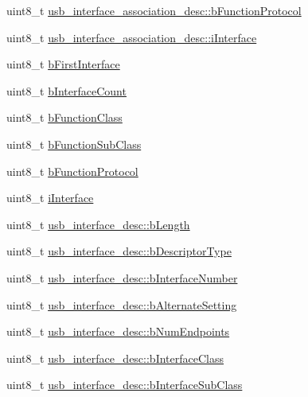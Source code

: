 \begin{DoxyCompactItemize}
\item 
uint8\-\_\-t \hyperlink{group___p_i_o_s___u_s_b___d_e_f_s_gae62dbcef82dd75a085f93d53a9c3e515}{usb\-\_\-interface\-\_\-association\-\_\-desc\-::b\-Function\-Protocol}
\item 
uint8\-\_\-t \hyperlink{group___p_i_o_s___u_s_b___d_e_f_s_gaa00aa6d432539190581b46990ad5cdf5}{usb\-\_\-interface\-\_\-association\-\_\-desc\-::i\-Interface}
\item 
uint8\-\_\-t \hyperlink{group___p_i_o_s___u_s_b___d_e_f_s_ga85323ed61eb948bdea147d67e01ddc2d}{b\-First\-Interface}
\item 
uint8\-\_\-t \hyperlink{group___p_i_o_s___u_s_b___d_e_f_s_ga9674bda677f9898106ec2b6fe5f5723d}{b\-Interface\-Count}
\item 
uint8\-\_\-t \hyperlink{group___p_i_o_s___u_s_b___d_e_f_s_ga1ed25bc3320ca90e4d3acb4410aea704}{b\-Function\-Class}
\item 
uint8\-\_\-t \hyperlink{group___p_i_o_s___u_s_b___d_e_f_s_gab25f749c091ce99b6868c949c4e45bc3}{b\-Function\-Sub\-Class}
\item 
uint8\-\_\-t \hyperlink{group___p_i_o_s___u_s_b___d_e_f_s_ga2b3b905ab34e6e28b57c3ddc51b3487c}{b\-Function\-Protocol}
\item 
uint8\-\_\-t \hyperlink{group___p_i_o_s___u_s_b___d_e_f_s_ga2e4535908d90f195c6347a91e15b544d}{i\-Interface}
\item 
uint8\-\_\-t \hyperlink{group___p_i_o_s___u_s_b___d_e_f_s_gaa4b60d12645813f528deae9301fe2103}{usb\-\_\-interface\-\_\-desc\-::b\-Length}
\item 
uint8\-\_\-t \hyperlink{group___p_i_o_s___u_s_b___d_e_f_s_ga324795326b03fff1d5c298b8dde76dc9}{usb\-\_\-interface\-\_\-desc\-::b\-Descriptor\-Type}
\item 
uint8\-\_\-t \hyperlink{group___p_i_o_s___u_s_b___d_e_f_s_ga18e33c3c1b7bf4ea4cff62e4d603afd9}{usb\-\_\-interface\-\_\-desc\-::b\-Interface\-Number}
\item 
uint8\-\_\-t \hyperlink{group___p_i_o_s___u_s_b___d_e_f_s_ga9fd5069255e2ed4e8c8bee39fd5c3e19}{usb\-\_\-interface\-\_\-desc\-::b\-Alternate\-Setting}
\item 
uint8\-\_\-t \hyperlink{group___p_i_o_s___u_s_b___d_e_f_s_ga685562326d8af1c5eccd71bdb2794cd1}{usb\-\_\-interface\-\_\-desc\-::b\-Num\-Endpoints}
\item 
uint8\-\_\-t \hyperlink{group___p_i_o_s___u_s_b___d_e_f_s_ga01e526f1b9ab4ee18ebeb28b17a5f7e8}{usb\-\_\-interface\-\_\-desc\-::b\-Interface\-Class}
\item 
uint8\-\_\-t \hyperlink{group___p_i_o_s___u_s_b___d_e_f_s_gaf937eb2ea941b0470ccd69ae9c5478ac}{usb\-\_\-interface\-\_\-desc\-::b\-Interface\-Sub\-Class}

\end{DoxyCompactItemize}
